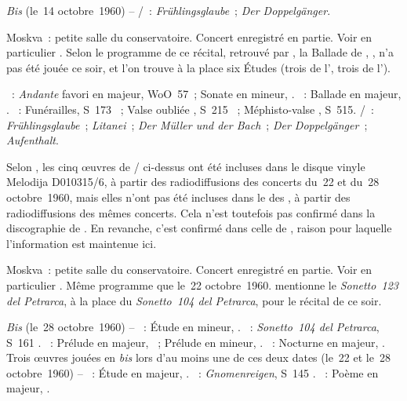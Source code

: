 \begin{description}
 \emph{Bis} (le~14 octobre~1960) -- \textsc{\Schubert{}/\Liszt{}}~:
 \emph{Frühlingsglaube}~; \emph{Der Doppelgänger}.
 \item[\DateWithWeekDay{1960-10-22}]
 Moskva~: petite salle du conservatoire.
 Concert enregistré en partie.
 Voir en particulier \citet[p.~451-452]{Milshteyn82a}.
 Selon le programme de ce récital, retrouvé par \citet{TADGO1960}, la
 Ballade de \Chopin{}, , n'a pas été jouée ce soir, et l'on trouve
 à la place six Études (trois de l', trois de l').

 \textsc{\Beethoven{}}~: \emph{Andante} favori en \kF majeur, WoO~57~;
 Sonate en \kF mineur, .
 \textsc{\Chopin{}}~: Ballade en \kA \Flat majeur, .
 \textsc{\Liszt{}}~: Funérailles, S~173 ~; Valse oubliée
 , S~215 ~; Méphisto-valse , S~515.
 \textsc{\Schubert{}/\Liszt{}}~: \emph{Frühlingsglaube}~; \emph{Litanei}~;
 \emph{Der Müller und der Bach}~; \emph{Der Doppelgänger}~;
 \emph{Aufenthalt}.

 Selon \citet[p.~70, note~13]{White}, les cinq œuvres de
 \Schubert{}/\Liszt{} ci-dessus ont été incluses dans le disque vinyle
 Melodija D010315/6, à partir des radiodiffusions des concerts du~22 et
 du~28 octobre~1960, mais elles n'ont pas été incluses dans le 
 des , à partir des radiodiffusions des
 mêmes concerts.
 Cela n'est toutefois pas confirmé dans la discographie de
 \citet[p.~69]{Malik}.
 En revanche, c'est confirmé dans celle de \citet[p.~2]{Nikonovich11}
 \citep[voir aussi][p.~377]{Scriabine}, raison pour laquelle l'information
 est maintenue ici.
 \item[\DateWithWeekDay{1960-10-28}]
 Moskva~: petite salle du conservatoire.
 Concert enregistré en partie.
 Voir en particulier \citet[p.~451-452]{Milshteyn82a}.
 Même programme que le~22 octobre~1960.
 \citet[p.~452]{Milshteyn82a} mentionne le \emph{Sonetto~123 del Petrarca},
 à la place du \emph{Sonetto~104 del Petrarca}, pour le récital de ce soir.

 \emph{Bis} (le~28 octobre~1960) -- \textsc{\Chopin{}}~: Étude en \kC \Sharp
 mineur,  .
 \textsc{\Liszt{}}~: \emph{Sonetto~104 del Petrarca}, S~161 .
 \textsc{\Rachmaninov{}}~: Prélude en \kG majeur,  ~;
 Prélude en \kG \Sharp mineur,  .
 \textsc{\Chopin{}}~: Nocturne en \kF \Sharp majeur,  .
 Trois œuvres jouées en \emph{bis} lors d'au moins une de ces deux dates
 (le~22 et le~28 octobre~1960) -- \textsc{\Chopin{}}~: Étude en \kE majeur,
  .
 \textsc{\Liszt{}}~: \emph{Gnomenreigen}, S~145 .
 \textsc{\Scriabine{}}~: Poème en \kF \Sharp majeur,  .


\end{description}
